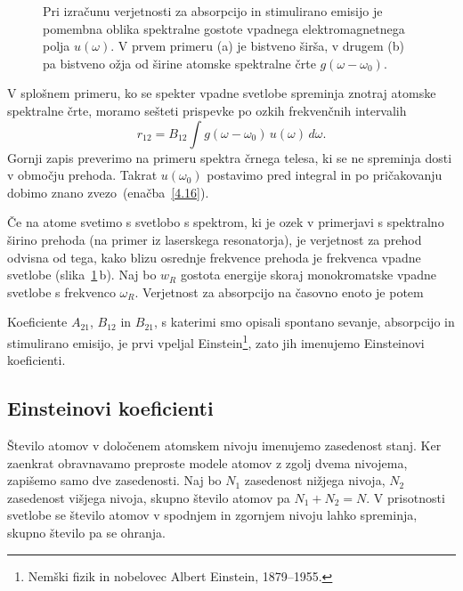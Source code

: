 \begin{figure}[h]
\centering
\def\svgwidth{140truemm} 

\caption{Pri izračunu verjetnosti za absorpcijo in stimulirano emisijo je 
pomembna oblika spektralne gostote vpadnega elektromagnetnega polja $u(\omega)$. V prvem primeru (a) je 
bistveno širša, v drugem (b) pa bistveno ožja od širine atomske spektralne črte $g(\omega-\omega_0)$.}
\label{fig:spektri}
\end{figure}

V splošnem primeru, ko se spekter vpadne svetlobe spreminja znotraj 
atomske spektralne črte, moramo sešteti prispevke po ozkih frekvenčnih intervalih
\begin{equation}
r_{12}=B_{12}\int g(\omega-\omega_0)\, u(\omega)\, d\omega.
\label{4.19}
\end{equation}
Gornji zapis preverimo na primeru spektra črnega telesa, ki se ne spreminja 
dosti v območju prehoda. Takrat $u(\omega_0)$ postavimo pred integral in po pričakovanju
dobimo znano zvezo~(enačba~\ref{4.16}). 

Če na atome svetimo s svetlobo s spektrom, ki je ozek v primerjavi s spektralno 
širino prehoda (na primer iz laserskega resonatorja), je verjetnost za prehod 
odvisna od tega, kako blizu osrednje frekvence prehoda je frekvenca vpadne 
svetlobe (slika~\ref{fig:spektri}\,b). Naj bo  $w_{R}$ gostota energije skoraj
monokromatske vpadne svetlobe s frekvenco $\omega_R$. Verjetnost za absorpcijo na časovno 
enoto je potem  

Koeficiente $A_{21}$, $B_{12}$ in $B_{21}$, s katerimi smo opisali spontano sevanje,
absorpcijo in stimulirano emisijo, je prvi vpeljal Einstein\footnote{Nemški fizik
in nobelovec Albert Einstein, 1879--1955.}, zato jih imenujemo 
Einsteinovi koeficienti. 

\subsection*{Einsteinovi koeficienti}
\label{AB}
Število atomov v določenem atomskem nivoju imenujemo zasedenost stanj. 
Ker zaenkrat obravnavamo preproste modele atomov z zgolj 
dvema nivojema, zapišemo samo dve zasedenosti. Naj bo $N_1$ zasedenost 
nižjega nivoja, $N_{2}$ zasedenost višjega nivoja, skupno število atomov pa
$N_1+N_2=N$. V prisotnosti svetlobe se število atomov v spodnjem in zgornjem 
nivoju lahko spreminja, skupno število pa se ohranja.

